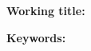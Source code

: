 \begin{center}
\textbf{Working title:} \manuscripttitle

\vspace{0.5em}
\textbf{Keywords:} \manuscriptkeywords
\end{center}
